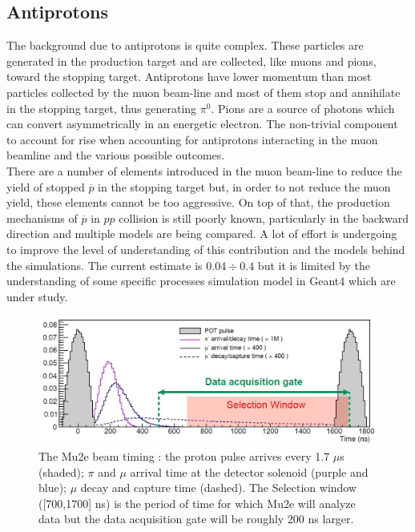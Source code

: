 \documentclass[12pt,a4paper,openright, oneside, titlepage]{book} %
\begin{document}
\subsection{Antiprotons}
\label{sec:antiprotons}
The background due to  antiprotons is quite complex. 
These particles are generated in the production target and are collected, like muons and pions, toward the stopping target. 
Antiprotons have lower momentum than most particles collected by the muon beam-line and most of them stop and annihilate in the stopping target, thus generating $\pi^0$. 
Pions are a source of photons which can convert asymmetrically in an energetic electron.
The non-trivial component to account for rise when accounting for antiprotons interacting in the muon beamline and the various possible outcomes.\\
There are a number of elements introduced in the muon beam-line to reduce the yield of stopped $\overline{p}$ in the stopping target but, in order to not reduce the muon yield, these elements cannot be too aggressive. 
On top of that, the production mechanisms of $\overline{p}$ in $pp$ collision is still poorly known, particularly in the backward direction and multiple models are being compared.
A lot of effort is undergoing to improve the level of  understanding of this contribution and the models behind the simulations. 
The current estimate is $0.04 \div 0.4$ \cite{Giovanni:2020} but it is limited by the understanding of some specific processes simulation model in Geant4 which are under study.

\begin{figure}[!htb]
\centering
\includegraphics[scale=0.7]{mu2e_event}
\caption[Mu2e event timing]{The Mu2e beam timing \cite{bob_mu2e}: the proton pulse arrives every 1.7 $\mu$s (shaded); 
$\pi$ and $\mu$ arrival time at the detector solenoid (purple and blue);
$\mu$ decay and capture time (dashed).
The Selection window ([700,1700] ns) is the period of time for which Mu2e will analyze data but the data acquisition gate will be roughly 200 ns larger.}
\label{_mu2e_event}
\end{figure}
\end{document}
